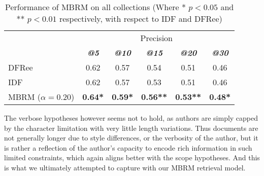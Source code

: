 \begin{table}[] 	
	  	  	\centering
	  	  	\caption{Performance of MBRM on all collections (Where * $p<0.05$ and ** $p<0.01$ respectively, with respect to IDF and DFRee)} 
	  	 	\begin{tabular}{l|c|c|c|c|c} 	  	 	
	  	 	\cline{2- 6}
	  	 	\multicolumn{1}{c}{}&\multicolumn{5}{c}{Precision} \\ 
	  	 	\cline{2- 6} &
	  	 	\textit{\textbf{@5}} & 
	  	 	\textit{\textbf{@10}} & 
	  	 	\textit{\textbf{@15}} & 
	  	 	\textit{\textbf{@20}} & 
	  	 	\textit{\textbf{@30}} 
	  	 	\tabularnewline
	  	 	\hline
	 	 	 DFRee  & 0.62 & 0.57 & 0.54 & 0.51 & 0.46 \\
	 	 	 IDF  & 0.62 & 0.57 & 0.53 & 0.51 & 0.46 \\
	 	 	 \hline
 	 	 	 \hline
  	  	 	 MBRM ($\alpha=0.20$)  & \textbf{0.64*} & \textbf{0.59*} & \textbf{0.56**} & \textbf{0.53**} & \textbf{0.48*} \\
	  	  	\hline
	  	  	\end{tabular}
	  	  	\label{MBRMPerformance}	
\end{table}


The verbose hypotheses however seems not to hold, as authors are simply capped by the character limitation with very little length variations. Thus documents are not generally longer due to style differences, or the verbosity of the author, but it is rather a reflection of the author's capacity to encode rich information in such limited constraints, which again aligns better with the scope hypotheses. And this is what we ultimately attempted to capture with our MBRM retrieval model.

